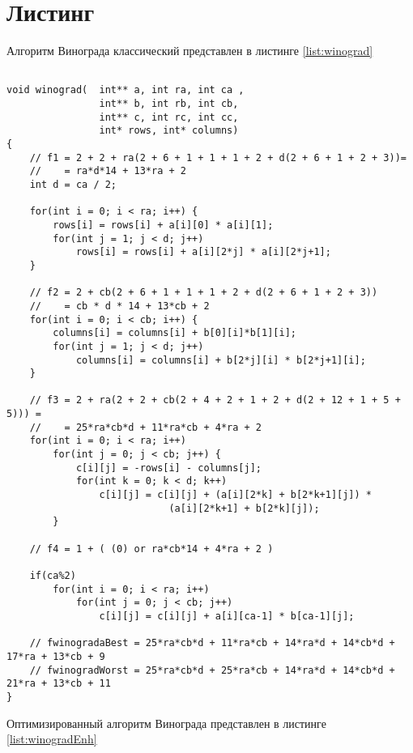 \section{ Листинг}
Алгоритм Винограда классический представлен в листинге \ref{list:winograd}
\begin{lstlisting}[style=CStyle, caption={Winograd algorithm},
                    label={list:winograd}]

void winograd(  int** a, int ra, int ca , 
                int** b, int rb, int cb, 
                int** c, int rc, int cc,
                int* rows, int* columns)
{
    // f1 = 2 + 2 + ra(2 + 6 + 1 + 1 + 1 + 2 + d(2 + 6 + 1 + 2 + 3))=
    //    = ra*d*14 + 13*ra + 2
    int d = ca / 2;

    for(int i = 0; i < ra; i++) {
        rows[i] = rows[i] + a[i][0] * a[i][1];
        for(int j = 1; j < d; j++)
            rows[i] = rows[i] + a[i][2*j] * a[i][2*j+1];
    }

    // f2 = 2 + cb(2 + 6 + 1 + 1 + 1 + 2 + d(2 + 6 + 1 + 2 + 3))
    //    = cb * d * 14 + 13*cb + 2
    for(int i = 0; i < cb; i++) {
        columns[i] = columns[i] + b[0][i]*b[1][i];
        for(int j = 1; j < d; j++)
            columns[i] = columns[i] + b[2*j][i] * b[2*j+1][i];
    }

    // f3 = 2 + ra(2 + 2 + cb(2 + 4 + 2 + 1 + 2 + d(2 + 12 + 1 + 5 + 5))) =
    //    = 25*ra*cb*d + 11*ra*cb + 4*ra + 2
    for(int i = 0; i < ra; i++)
        for(int j = 0; j < cb; j++) {
            c[i][j] = -rows[i] - columns[j];
            for(int k = 0; k < d; k++)
                c[i][j] = c[i][j] + (a[i][2*k] + b[2*k+1][j]) * 
                            (a[i][2*k+1] + b[2*k][j]);
        }

    // f4 = 1 + ( (0) or ra*cb*14 + 4*ra + 2 )

    if(ca%2)
        for(int i = 0; i < ra; i++)
            for(int j = 0; j < cb; j++)
                c[i][j] = c[i][j] + a[i][ca-1] * b[ca-1][j];

    // fwinogradaBest = 25*ra*cb*d + 11*ra*cb + 14*ra*d + 14*cb*d + 17*ra + 13*cb + 9
    // fwinogradWorst = 25*ra*cb*d + 25*ra*cb + 14*ra*d + 14*cb*d + 21*ra + 13*cb + 11
}
\end{lstlisting}

Оптимизированный алгоритм Винограда представлен в листинге \ref{list:winogradEnh}

